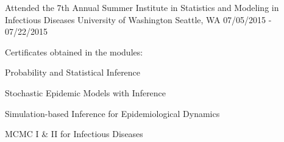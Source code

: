 \begin{cventries}
  \cventrytwo
    {Attended the 7th Annual Summer Institute in Statistics and Modeling in Infectious Diseases} %
    {University of Washington} %
    {Seattle, WA} %
    {07/05/2015 - 07/22/2015} %
    {}
	{Certificates obtained in the modules:
	\vspace{5mm}
    \begin{cvitems} 
    \item{Probability and Statistical Inference}
    \item{Stochastic Epidemic Models with Inference}
    \item{Simulation-based Inference for Epidemiological Dynamics}
    \item{MCMC I \& II for Infectious Diseases}
	\end{cvitems}      
    }
\end{cventries}